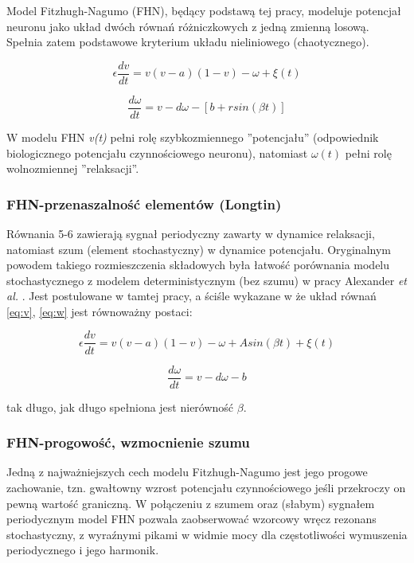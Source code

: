 \documentclass[12pt]{article}
\begin{document}
  Model Fitzhugh-Nagumo (FHN), będący podstawą tej pracy, modeluje potencjał neuronu jako układ dwóch równań różniczkowych z jedną zmienną losową. Spełnia zatem podstawowe kryterium układu nieliniowego (chaotycznego).

  \begin{equation} \label{eq:v}
    \epsilon \frac{dv}{dt} = v(v-a)(1-v)- \omega + \xi(t)
  \end{equation}

  \begin{equation} \label{eq:w}
    \frac{d \omega}{dt} = v - d \omega - [b + r sin(\beta t)]
  \end{equation}

  W modelu FHN \emph{v(t)} pełni rolę szybkozmiennego ''potencjału'' (odpowiednik biologicznego potencjału czynnościowego neuronu), natomiast $\omega (t)$ pełni rolę wolnozmiennej ''relaksacji''.

  \subsubsection{FHN-przenaszalność elementów (Longtin)}

  Równania 5-6 zawierają sygnał periodyczny zawarty w dynamice relaksacji, natomiast szum (element stochastyczny) w dynamice potencjału. Oryginalnym powodem takiego rozmieszczenia składowych była łatwość porównania modelu stochastycznego z modelem deterministycznym (bez szumu) w pracy Alexander \emph{et al.} \cite{alexander}. Jest postulowane w tamtej pracy, a ściśle wykazane w \cite{longtin} że układ równań \ref{eq:v}, \ref{eq:w} jest równoważny postaci:

  \begin{equation}
    \epsilon \frac{dv}{dt} = v(v-a)(1-v)- \omega + A sin(\beta t) + \xi(t)
  \end{equation}

  \begin{equation}
    \frac{d \omega}{dt} = v - d \omega - b
  \end{equation}

  tak długo, jak długo spełniona jest nierówność $\beta$.

  \subsubsection{FHN-progowość, wzmocnienie szumu}

  Jedną z najważniejszych cech modelu Fitzhugh-Nagumo jest jego progowe zachowanie, tzn. gwałtowny wzrost potencjału czynnościowego jeśli przekroczy on pewną wartość graniczną. W połączeniu z szumem oraz (słabym) sygnałem periodycznym model FHN pozwala zaobserwować wzorcowy wręcz rezonans stochastyczny, z wyraźnymi pikami w widmie mocy dla częstotliwości wymuszenia periodycznego i jego harmonik.
\end{document}
